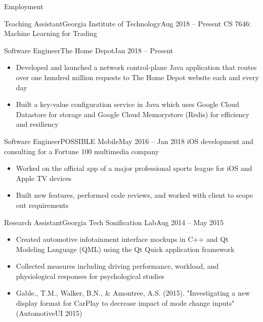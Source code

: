 \documentclass[]{mcdowellcv}
\begin{document}
	\begin{cvsection}{Employment}
		\begin{cvsubsection}{Teaching Assistant}{Georgia Institute of Technology}{Aug 2018 -- Present}
			CS 7646: Machine Learning for Trading
		\end{cvsubsection}

		\begin{cvsubsection}{Software Engineer}{The Home Depot}{Jan 2018 -- Present}
			\begin{itemize}
				\item Developed and launched a network control-plane Java application that routes over one hundred million requests to The Home Depot website each and every day
				\item Built a key-value configuration service in Java which uses Google Cloud Datastore for storage and Google Cloud Memorystore (Redis) for efficiency and resiliency
			\end{itemize}
		\end{cvsubsection}
		
		\begin{cvsubsection}{Software Engineer}{POSSIBLE Mobile}{May 2016 -- Jan 2018}	
			iOS development and consulting for a Fortune 100 multimedia company
			\begin{itemize}
				\item Worked on the official app of a major professional sports league for iOS and Apple TV devices
				\item Built new features, performed code reviews, and worked with client to scope out requirements
			\end{itemize}
		\end{cvsubsection}
		
		\begin{cvsubsection}{Research Assistant}{Georgia Tech Sonification Lab}{Aug 2014 -- May 2015}		
			\begin{itemize}
				\item Created automotive infotainment interface mockups in C++ and Qt Modeling Language (QML) using the Qt Quick application framework
				\item Collected measures including driving performance, workload, and physiological responses for psychological studies
				\item Gable., T.M., Walker, B.N., \& Amontree, A.S. (2015). "Investigating a new display format for CarPlay to decrease impact of mode change inputs" (AutomotiveUI 2015) 
			\end{itemize}
		\end{cvsubsection}
		

\end{cvsection}
\end{document}
